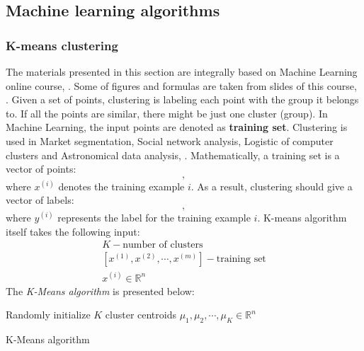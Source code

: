   \subsection{Machine learning algorithms}
    \subsubsection{K-means clustering}
          The materials presented in this section are integrally based on Machine Learning online course, \cite{ml}. Some of figures and formulas are taken from slides of this course, \cite{slides}.
Given a set of points, clustering is labeling each point with the group it belongs to. If all the points are similar, there might be just one cluster (group). In Machine Learning, the input points are denoted as \textbf{training set}. Clustering is used in Market segmentation, Social network analysis, Logistic of computer clusters and Astronomical data analysis, \cite{slides}. Mathematically, a training set is a vector of points:
      \begin{equation}
        [ x^{(1)}, x^{(2)}, \cdots, x^{(m)} ],
      \end{equation}
      where \( x^{(i)}\) denotes the training example \(i\). As a result, clustering should give a vector of labels:
      \begin{equation}
        [ y^{(1)}, y^{(2)}, \cdots, y^{(m)} ],
      \end{equation}
      where \( y^{(i)}\) represents the label for the training example \(i\). K-means algorithm itself takes the following input:
      \begin{gather}
        \nonumber
            K - \text{number of clusters} \\
            \nonumber
            [ x^{(1)}, x^{(2)}, \cdots, x^{(m)} ] - \text{training set} \\
            \nonumber
            x^{(i)} \in \mathbb{R}^n
      \end{gather}
      The \emph{K-Means algorithm} is presented below:
      \begin{algorithm}
        {Randomly initialize \(K\) cluster centroids $\mu_1, \mu_2, \cdots, \mu_K \in \mathbb{R}^n$}
        \begin{algorithmic}
          \Repeat 
            \EndFor
            \EndFor
        \end{algorithmic}
        \caption{K-Means algorithm}\label{alg:kmeans}
      \end{algorithm}
